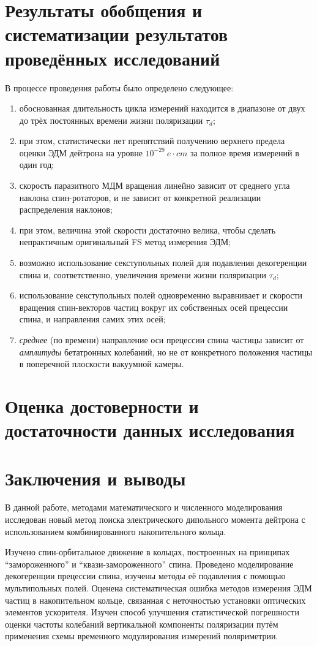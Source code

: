 \documentclass{report}
\newcommand{\LTd}{\tau_d}
\begin{document}
\chapter{Результаты обобщения и систематизации результатов проведённых исследований}

В процессе проведения работы было определено следующее:
\begin{enumerate}
	\item обоснованная длительность цикла измерений находится в диапазоне от двух до трёх постоянных времени жизни поляризации $\LTd$;
	\item при этом, статистически нет препятствий получению верхнего предела оценки ЭДМ дейтрона на уровне $10^{-29}~e\cdot cm$ за полное время измерений в один год;
	\item скорость паразитного МДМ вращения линейно зависит от среднего угла наклона спин-ротаторов, и не зависит от конкретной реализации распределения наклонов;
	\item при этом, величина этой скорости достаточно велика, чтобы сделать непрактичным оригинальный FS метод измерения ЭДМ;
	\item возможно использование секступольных полей для подавления декогеренции спина и, соответственно, увеличения времени жизни поляризации $\LTd$;
	\item использование секступольных полей одновременно выравнивает и скорости вращения спин-векторов частиц вокруг их собственных осей прецессии спина, и направления самих этих осей;
	\item \emph{среднее} (по времени) направление оси прецессии спина частицы зависит от \emph{амплитуды} бетатронных колебаний, но не от конкретного положения частицы в поперечной плоскости вакуумной камеры.
\end{enumerate}

\chapter{Оценка достоверности и достаточности данных исследования}

\chapter{Заключения и выводы}
В данной работе, методами математического и численного моделирования исследован новый метод поиска электрического дипольного момента дейтрона с использованием комбинированного накопительного кольца. 

Изучено спин-орбитальное движение в кольцах, построенных на принципах ``замороженного'' и ``квази-замороженного'' спина. Проведено моделирование декогеренции прецессии спина, изучены методы её подавления с помощью мультипольных полей. Оценена систематическая ошибка методов измерения ЭДМ частиц в накопительном кольце, связанная с неточностью установки оптических элементов ускорителя. Изучен способ улучшения статистической погрешности оценки частоты колебаний вертикальной компоненты поляризации путём применения схемы временного модулирования измерений поляриметрии. 





\end{document}
